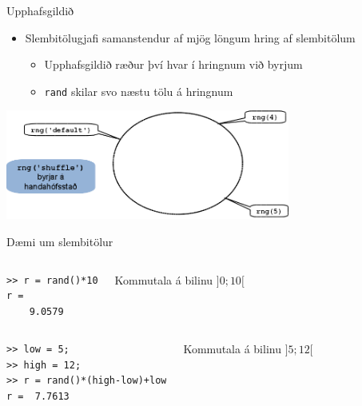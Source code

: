 \documentclass[handout]{beamer}
\begin{document}
\begin{frame}[shrink]{Upphafsgildið}
\vspace{1cm}
\begin{itemize}
 \item Slembitölugjafi samanstendur af mjög löngum hring af slembitölum
 \begin{itemize}
  \item Upphafsgildið ræður því hvar í hringnum við byrjum
  \item \texttt{rand} skilar svo næstu tölu á hringnum
 \end{itemize}
\end{itemize}
\begin{center}
\includegraphics[width=0.7\textwidth]{Pics/random-circle}
\end{center}
\end{frame}

\begin{frame}[fragile]{Dæmi um slembitölur}
\vspace{-0.5cm}
\begin{columns}
\begin{verbatim}
>> r = rand()*10
r =
    9.0579
\end{verbatim}
Kommutala á bilinu $]0;10[$
\end{columns}

\begin{columns}
\begin{verbatim}
>> low = 5;
>> high = 12;
>> r = rand()*(high-low)+low
r =  7.7613
\end{verbatim}
Kommutala á bilinu $]5;12[$
\end{columns}
\end{frame}
\end{document}
